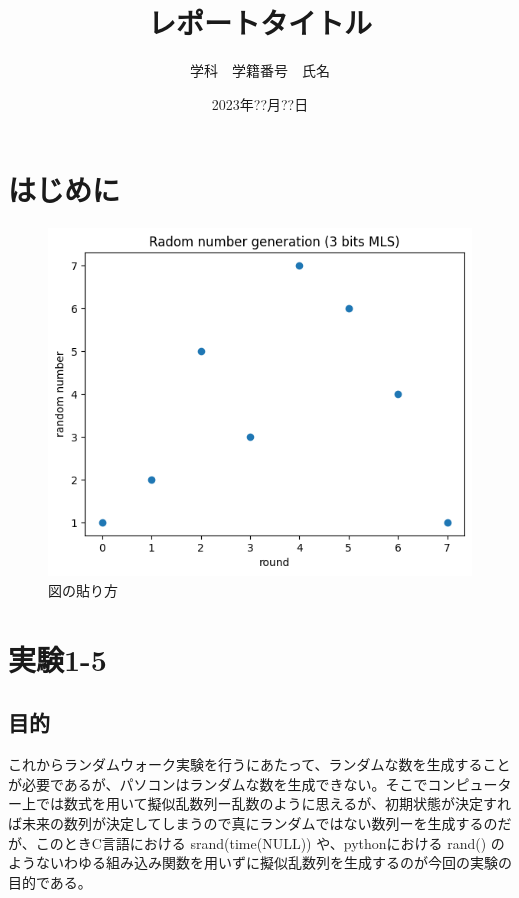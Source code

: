 \documentclass[xelatex,ja=standard]{bxjsarticle}
\begin{document}

\title{レポートタイトル}
\author{学科　学籍番号　氏名}
\date{2023年??月??日}
\maketitle
\section{はじめに}

\begin{figure}[htbp]
    \centering
    \includegraphics[scale=0.5]
{sample.png}
    \caption{図の貼り方}
    \label{fig:sample_figure}
\end{figure}

\section{実験1-5}

\subsection{目的}

これからランダムウォーク実験を行うにあたって、ランダムな数を生成することが必要であるが、パソコンはランダムな数を生成できない。そこでコンピューター上では数式を用いて擬似乱数列ー乱数のように思えるが、初期状態が決定すれば未来の数列が決定してしまうので真にランダムではない数列ーを生成するのだが、このときC言語における srand(time(NULL)) や、pythonにおける rand() のようないわゆる組み込み関数を用いずに擬似乱数列を生成するのが今回の実験の目的である。
\end{document}
